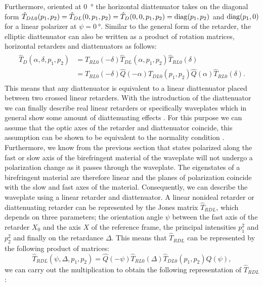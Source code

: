 Furthermore, oriented at \SI{0}{\degree} the horizontal diattenuator takes on the diagonal form $\hat{T}_{DL0}(p_1, p_2) = \hat{T}_{DL}(0, p_1, p_2)=\hat{T}_{D}(0,0,p_1,p_2)=\operatorname{diag}(p_1, p_2)$ and $\operatorname{diag}(p_1, 0)$ for a linear polarizer at $\psi = \SI{0}{\degree}$. Similar to the general form of the retarder, the elliptic diattenuator can also be written as a product of rotation matrices, horizontal retarders and diattenuators as follows:
\begin{align}
\begin{split}
    \hat{T}_{D}(\alpha, \delta, p_1, p_2) 
    &= \hat{T}_{RL0}(-\delta)\hat{T}_{DL}(\alpha, p_1, p_2)\hat{T}_{RL0}(\delta) \\
    &= \hat{T}_{RL0}(-\delta)\hat{Q}(-\alpha)\hat{T}_{DL0}(p_1, p_2)\hat{Q}(\alpha)\hat{T}_{RL0}(\delta).
\end{split}
\end{align}
This means that any diattenuator is equivalent to a linear diattenuator placed between two crossed linear retarders. With the introduction of the diattenuator we can finally describe real linear retarders or specifically waveplates which in general show some amount of diattenuating effects \cite{D.CLARKE1971PolarizedMeasurement}. For this purpose we can assume that the optic axes of the retarder and diattenuator coincide, this assumption can be shown to be equivalent to the normality condition \cite{Bass1995HandbookOptics}. Furthermore, we know from the previous section that states polarized along the fast or slow axis of the birefringent material of the waveplate will not undergo a polarization change as it passes through the waveplate. The eigenstates of a birefringent material are therefore linear and the planes of polarization coincide with the slow and fast axes of the material. Consequently, we can describe the waveplate using a linear retarder and diattenuator. A linear nonideal retarder or diattenuating retarder can be represented by the Jones matrix $\hat{T}_{RDL}$, which depends on three parameters; the orientation angle $\psi$ between the fast axis of the retarder $X_0$ and the axis $X$ of the reference frame, the principal intensities $p_1^2$ and $p_2^2$ and finally on the retardance $\Delta$. This means that $\hat{T}_{RDL}$ can be represented by the following product of matrices:
\begin{equation}
    \hat{T}_{RDL}(\psi, \Delta, p_1, p_2) = \hat{Q}(-\psi)\hat{T}_{RL0}(\Delta)\hat{T}_{DL0}(p_1, p_2)\hat{Q}(\psi),
\end{equation}
we can carry out the multiplication to obtain the following representation of $\hat{T}_{RDL}$:
